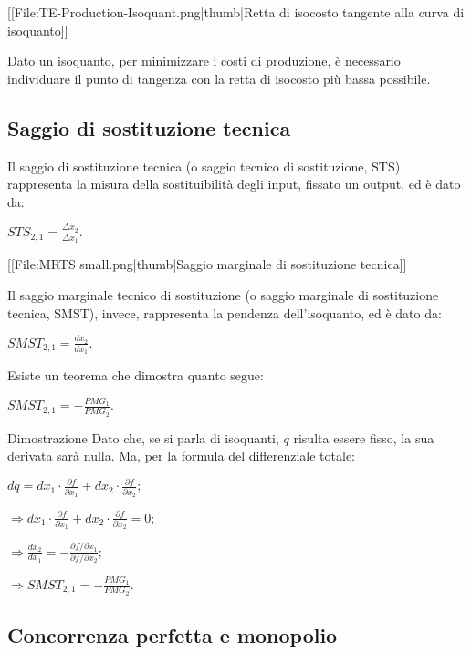 [[File:TE-Production-Isoquant.png|thumb|Retta di isocosto tangente alla curva 
di isoquanto]]

Dato un isoquanto, per minimizzare i costi di produzione, è necessario 
individuare il punto di tangenza con la retta di isocosto più bassa 
possibile. %

\subsection{Saggio di sostituzione tecnica}

Il saggio di sostituzione tecnica (o saggio tecnico di sostituzione, 
STS)
rappresenta la misura della sostituibilità degli input, fissato un output, ed è 
dato da:

\(STS_{2,1}=\frac{\Delta x_2}{\Delta x_1}.\)

[[File:MRTS small.png|thumb|Saggio marginale di sostituzione tecnica]]

Il saggio marginale tecnico di sostituzione (o saggio marginale di 
sostituzione tecnica, SMST),
invece, rappresenta la pendenza dell'isoquanto, ed è dato da:

\(SMST_{2,1}=\frac{dx_2}{dx_1}.\)

Esiste un teorema che dimostra quanto segue:

\(SMST_{2,1}=-\frac{PMG_1}{PMG_2}.\)

Dimostrazione
Dato che, se si parla di isoquanti, \(q\) risulta essere fisso, la sua 
derivata sarà nulla. Ma, per la formula del differenziale totale:

\(dq=dx_1\cdot \frac{\partial f}{\partial x_1}+dx_2\cdot \frac{\partial 
f}{\partial x_2};\)

\(\Rightarrow dx_1\cdot \frac{\partial f}{\partial x_1}+dx_2\cdot 
\frac{\partial f}{\partial x_2}=0;\)

\(\Rightarrow \frac{dx_2}{dx_1}=-\frac{\partial f/\partial x_1}{\partial 
f/\partial x_2};\)

\(\Rightarrow SMST_{2,1}=-\frac{PMG_1}{PMG_2}.\)

\subsection{Concorrenza perfetta e monopolio}

